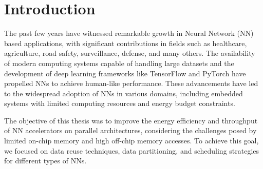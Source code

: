 \begin{comment}
\section{Conclusion}
In conclusion, this thesis has made significant strides in the realm of energy-efficient NN inferencing on edge devices. By leveraging data reuse techniques, quantization approaches, and an analytical framework for estimating off-chip memory accesses, we have demonstrated that it is possible to achieve remarkable energy efficiency improvements without sacrificing accuracy. The proposed solutions contribute to the advancement of NN accelerators for a wide range of applications, from healthcare and agriculture to autonomous driving and recommender systems.

The findings presented in this work offer valuable insights into optimizing neural network performance on parallel architectures, with implications for the broader domain of artificial intelligence. As the field of NN applications continues to grow and evolve, the research conducted here paves the way for more energy-efficient, high-performance NN inferencing on edge devices.

We hope that the outcomes of this research will inspire further exploration and innovation, ultimately leading to the development of smarter and more energy-conscious artificial intelligence systems that positively impact various aspects of human life.
\end{comment}
\section{Introduction}
The past few years have witnessed remarkable growth in Neural Network (NN) based applications, with significant contributions in fields such as healthcare, agriculture, road safety, surveillance, defense, and many others. The availability of modern computing systems capable of handling large datasets and the development of deep learning frameworks like TensorFlow and PyTorch have propelled NNs to achieve human-like performance. These advancements have led to the widespread adoption of NNs in various domains, including embedded systems with limited computing resources and energy budget constraints.

The objective of this thesis was to improve the energy efficiency and throughput of NN accelerators on parallel architectures, considering the challenges posed by limited on-chip memory and high off-chip memory accesses. To achieve this goal, we focused on data reuse techniques, data partitioning, and scheduling strategies for different types of NNs.

